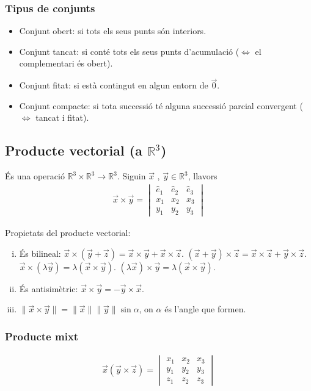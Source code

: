 \subsubsection*{Tipus de conjunts}
\begin{itemize}
    \item Conjunt obert: si tots els seus punts són interiors.
    \item Conjunt tancat: si conté tots els seus punts d'acumulació ($\Leftrightarrow$ el complementari és obert).
    \item Conjunt fitat: si està contingut en algun entorn de $\vec{0}$.
    \item Conjunt compacte: si tota successió té alguna successió parcial convergent ($\Leftrightarrow$ tancat i fitat).
\end{itemize}

\subsection{Producte vectorial (a $\mathbb{R}^{3}$)}
\begin{defi}
    És una operació $\mathbb{R}^{3} \times \mathbb{R}^{3} \to \mathbb{R}^{3}$. Siguin $\vec{x}$ , $\vec{y} \in \mathbb{R}^{3}$, llavors
    \begin{align}
        \vec{x} \times \vec{y} = \begin{vmatrix} \hat{e}_{1} & \hat{e}_{2} & \hat{e}_{3} \\ x_{1} & x_{2} & x_{3} \\ y_{1} & y_{2} & y_{3} \end{vmatrix}
    \end{align}
\end{defi}
Propietats del producte vectorial:
\begin{enumerate}[i)]
    \item És bilineal: 
        \subitem $\vec{x} \times (\vec{y} + \vec{z}) = \vec{x} \times \vec{y} + \vec{x} \times \vec{z}$.
        \subitem $(\vec{x} + \vec{y}) \times \vec{z} = \vec{x} \times \vec{z} + \vec{y} \times \vec{z}$.
        \subitem $\vec{x} \times (\lambda \vec{y}) = \lambda (\vec{x} \times \vec{y})$.
        \subitem $(\lambda \vec{x}) \times \vec{y} = \lambda (\vec{x} \times \vec{y})$.
    \item És antisimètric: $\vec{x} \times \vec{y} = -\vec{y} \times \vec{x}$.
    \item $\| \vec{x} \times \vec{y} \| = \| \vec{x} \| \| \vec{y} \| \sin \alpha$, on $\alpha$ és l'angle que formen.
\end{enumerate}

\subsubsection*{Producte mixt}
\begin{align}
    \vec{x} (\vec{y} \times \vec{z}) = \begin{vmatrix} x_{1} & x_{2} & x_{3} \\ y_{1} & y_{2} & y_{3} \\ z_{1} & z_{2} & z_{3} \end{vmatrix}
\end{align}

